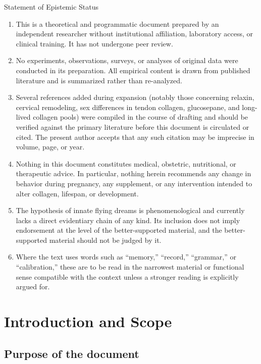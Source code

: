 \documentclass[11pt,a4paper]{article}
\theoremstyle{plain}
\theoremstyle{definition}
\theoremstyle{remark}
\begin{document}
\begin{statusbox}{Statement of Epistemic Status}
\small
\begin{enumerate}[leftmargin=1.4em,itemsep=2pt]
\item This is a theoretical and programmatic document prepared by an independent researcher without institutional affiliation, laboratory access, or clinical training. It has not undergone peer review.
\item No experiments, observations, surveys, or analyses of original data were conducted in its preparation. All empirical content is drawn from published literature and is summarized rather than re-analyzed.
\item Several references added during expansion (notably those concerning relaxin, cervical remodeling, sex differences in tendon collagen, glucosepane, and long-lived collagen pools) were compiled in the course of drafting and should be verified against the primary literature before this document is circulated or cited. The present author accepts that any such citation may be imprecise in volume, page, or year.
\item Nothing in this document constitutes medical, obstetric, nutritional, or therapeutic advice. In particular, nothing herein recommends any change in behavior during pregnancy, any supplement, or any intervention intended to alter collagen, lifespan, or development.
\item The hypothesis of innate flying dreams is phenomenological and currently lacks a direct evidentiary chain of any kind. Its inclusion does not imply endorsement at the level of the better-supported material, and the better-supported material should not be judged by it.
\item Where the text uses words such as ``memory,'' ``record,'' ``grammar,'' or ``calibration,'' these are to be read in the narrowest material or functional sense compatible with the context unless a stronger reading is explicitly argued for.
\end{enumerate}
\end{statusbox}

\tableofcontents
\newpage
\section{Introduction and Scope}

\subsection{Purpose of the document}
\end{document}
